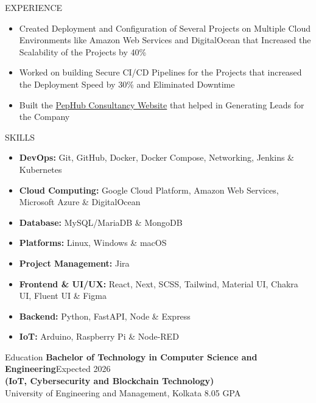 \documentclass{resume}
\begin{document}
\begin{rSection}{EXPERIENCE}
  \begin{itemize}
    \item {Created Deployment and Configuration of Several Projects on Multiple Cloud Environments like Amazon Web Services and DigitalOcean that Increased the Scalability of the Projects by 40\%}
          \vspace{-0.2em}
    \item {Worked on building Secure CI/CD Pipelines for the Projects that increased the Deployment Speed by 30\% and Eliminated Downtime}
          \vspace{-0.2em}
    \item {Built the {\href{https://consultancy.pephub.tech}{PepHub Consultancy Website}} that helped in Generating Leads for the Company}
  \end{itemize}
\end{rSection}
\vspace{-0.4em}
\begin{rSection}{SKILLS}
  \begin{itemize}
    \item \textbf{DevOps:} Git, GitHub, Docker, Docker Compose, Networking, Jenkins \& Kubernetes
          \vspace{-0.2em}
    \item \textbf{Cloud Computing:} Google Cloud Platform, Amazon Web Services, Microsoft Azure \& DigitalOcean
          \vspace{-0.2em}
    \item \textbf{Database: } MySQL/MariaDB \& MongoDB
          \vspace{-0.2em}
    \item \textbf{Platforms:} Linux, Windows \& macOS
    \item \textbf{Project Management:} Jira
          \vspace{-0.2em}
    \item \textbf{Frontend \& UI/UX: } React, Next, SCSS, Tailwind, Material UI, Chakra UI, Fluent UI \& Figma
          \vspace{-0.2em}
    \item \textbf{Backend: } Python, FastAPI, Node \& Express
          \vspace{-0.2em}
    \item \textbf{IoT:} Arduino, Raspberry Pi \& Node-RED
  \end{itemize}
\end{rSection}
\vspace{-0.4em}
\begin{rSection}{Education}
  \textbf{Bachelor of Technology in Computer Science and Engineering}\hfill {Expected 2026}\\
  \textbf{(IoT, Cybersecurity and Blockchain Technology)}\\
  University of Engineering and Management, Kolkata \hfill  8.05 GPA
\end{rSection}
\end{document}
